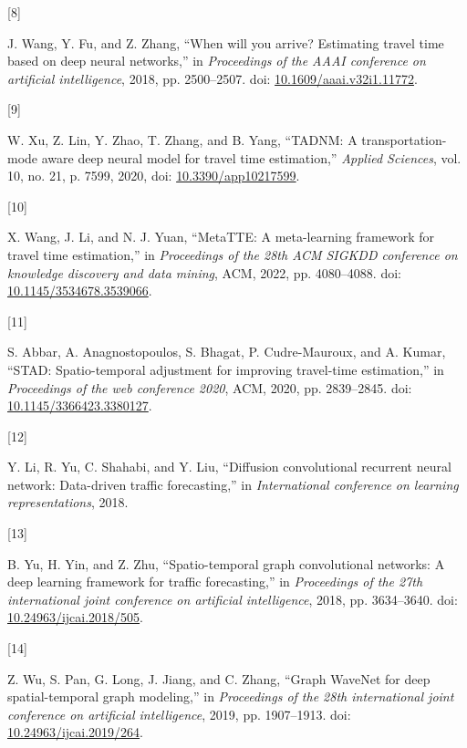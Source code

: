 \documentclass[
  10pt,
  letterpaper,
  lettersize,
  journal]{IEEEtran}
\newlength{\cslhangindent}
\newlength{\csllabelwidth}
\newenvironment{CSLReferences}[2] %
 {\begin{list}{}{%
  \setlength{\itemindent}{0pt}
  \setlength{\leftmargin}{0pt}
  \setlength{\parsep}{0pt}
  \ifodd #1
   \setlength{\leftmargin}{\cslhangindent}
   \setlength{\itemindent}{-1\cslhangindent}
  \fi
  \setlength{\itemsep}{#2\baselineskip}}}
 {\end{list}}
\newcommand{\CSLLeftMargin}[1]{\parbox[t]{\csllabelwidth}{\strut#1\strut}}
\newcommand{\CSLRightInline}[1]{\parbox[t]{\linewidth - \csllabelwidth}{\strut#1\strut}}
\begin{document}
\begin{CSLReferences}{0}{0}
\CSLLeftMargin{{[}8{]} }%
\CSLRightInline{J. Wang, Y. Fu, and Z. Zhang, {``When will you arrive?
Estimating travel time based on deep neural networks,''} in
\emph{Proceedings of the AAAI conference on artificial intelligence},
2018, pp. 2500--2507. doi:
\href{https://doi.org/10.1609/aaai.v32i1.11772}{10.1609/aaai.v32i1.11772}.}

\CSLLeftMargin{{[}9{]} }%
\CSLRightInline{W. Xu, Z. Lin, Y. Zhao, T. Zhang, and B. Yang, {``TADNM:
A transportation-mode aware deep neural model for travel time
estimation,''} \emph{Applied Sciences}, vol. 10, no. 21, p. 7599, 2020,
doi: \href{https://doi.org/10.3390/app10217599}{10.3390/app10217599}.}

\CSLLeftMargin{{[}10{]} }%
\CSLRightInline{X. Wang, J. Li, and N. J. Yuan, {``MetaTTE: A
meta-learning framework for travel time estimation,''} in
\emph{Proceedings of the 28th ACM SIGKDD conference on knowledge
discovery and data mining}, ACM, 2022, pp. 4080--4088. doi:
\href{https://doi.org/10.1145/3534678.3539066}{10.1145/3534678.3539066}.}

\CSLLeftMargin{{[}11{]} }%
\CSLRightInline{S. Abbar, A. Anagnostopoulos, S. Bhagat, P.
Cudre-Mauroux, and A. Kumar, {``STAD: Spatio-temporal adjustment for
improving travel-time estimation,''} in \emph{Proceedings of the web
conference 2020}, ACM, 2020, pp. 2839--2845. doi:
\href{https://doi.org/10.1145/3366423.3380127}{10.1145/3366423.3380127}.}

\CSLLeftMargin{{[}12{]} }%
\CSLRightInline{Y. Li, R. Yu, C. Shahabi, and Y. Liu, {``Diffusion
convolutional recurrent neural network: Data-driven traffic
forecasting,''} in \emph{International conference on learning
representations}, 2018.}

\CSLLeftMargin{{[}13{]} }%
\CSLRightInline{B. Yu, H. Yin, and Z. Zhu, {``Spatio-temporal graph
convolutional networks: A deep learning framework for traffic
forecasting,''} in \emph{Proceedings of the 27th international joint
conference on artificial intelligence}, 2018, pp. 3634--3640. doi:
\href{https://doi.org/10.24963/ijcai.2018/505}{10.24963/ijcai.2018/505}.}

\CSLLeftMargin{{[}14{]} }%
\CSLRightInline{Z. Wu, S. Pan, G. Long, J. Jiang, and C. Zhang, {``Graph
WaveNet for deep spatial-temporal graph modeling,''} in
\emph{Proceedings of the 28th international joint conference on
artificial intelligence}, 2019, pp. 1907--1913. doi:
\href{https://doi.org/10.24963/ijcai.2019/264}{10.24963/ijcai.2019/264}.}


\end{CSLReferences}
\end{document}
